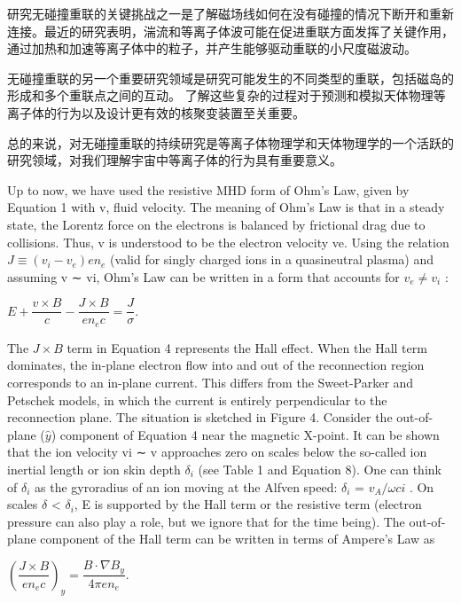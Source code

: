 \documentclass[12pt, a4paper, oneside]{article}
\begin{document}
\begin{spacing}{2.0}
研究无碰撞重联的关键挑战之一是了解磁场线如何在没有碰撞的情况下断开和重新连接。最近的研究表明，湍流和等离子体波可能在促进重联方面发挥了关键作用，
通过加热和加速等离子体中的粒子，并产生能够驱动重联的小尺度磁波动。

无碰撞重联的另一个重要研究领域是研究可能发生的不同类型的重联，包括磁岛的形成和多个重联点之间的互动。
了解这些复杂的过程对于预测和模拟天体物理等离子体的行为以及设计更有效的核聚变装置至关重要。

总的来说，对无碰撞重联的持续研究是等离子体物理学和天体物理学的一个活跃的研究领域，对我们理解宇宙中等离子体的行为具有重要意义。

Up to now, we have used the resistive MHD form of Ohm's Law, given by Equation 1 with v, fluid
velocity. The meaning of Ohm's Law is that in a steady state, the Lorentz force on the electrons
is balanced by frictional drag due to collisions. Thus, v is understood to be the electron velocity
ve. Using the relation $J\equiv(v_i-v_e)en_e$ (valid for singly charged ions in a quasineutral plasma) and
assuming v ∼ vi, Ohm's Law can be written in a form that accounts for $v_e \ne v_i$ :
\begin{center}
    $E+\dfrac{v\times B}{c}-\dfrac{J\times B}{en_ec}=\dfrac{J}{\sigma}.$
\end{center}
The $J \times B$ term in Equation 4 represents the Hall effect. When the Hall term dominates,
the in-plane electron flow into and out of the reconnection region corresponds to an in-plane
current. This differs from the Sweet-Parker and Petschek models, in which the current is entirely
perpendicular to the reconnection plane. The situation is sketched in Figure 4.
Consider the out-of-plane ($\hat{y}$) component of Equation 4 near the magnetic X-point. It can be
shown that the ion velocity vi ∼ v approaches zero on scales below the so-called ion inertial length
or ion skin depth $\delta_{i}$ (see Table 1 and Equation 8). One can think of $\delta_{i}$ as the gyroradius of an ion
moving at the Alfven speed: $\delta_{i}$ = $v_A/\omega c i$ . On scales $\delta$ < $\delta_{i}$, E is supported by the Hall term or the
resistive term (electron pressure can also play a role, but we ignore that for the time being).
The out-of-plane component of the Hall term can be written in terms of Ampere's Law as
\begin{center}
    $\left(\dfrac{J\times B}{en_ec}\right)_y=\dfrac{B\cdot\nabla B_y}{4\pi en_e}.$
\end{center}



\end{spacing}
\end{document}
